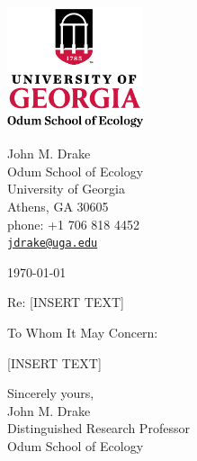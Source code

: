 \documentclass[12pt]{article}
\newcommand{\email}[1]{\href{mailto:#1}{\tt \textcolor{cornflower}{#1}}}
\begin{document}
\begin{minipage}[c]{8in}\vskip-2cm
	\begin{minipage}[c]{4in}
		\begin{flushleft}
			\includegraphics*[width=4cm]{Print-ODUM-V-FC.PNG}%
		\end{flushleft}
	\end{minipage}
	\begin{minipage}[c]{2.5in}
	\begin{flushright}
		{%
			John M. Drake \\
			Odum School of Ecology \\
			University of Georgia \\
			Athens, GA 30605 \\
			phone: +1 706 818 4452  \\
			\email{jdrake@uga.edu}
		}
	\end{flushright}
	\end{minipage}
\end{minipage}

\begin{adjustwidth}{4em}{4em}

\vspace{10mm}

\noindent \today

\vspace{2mm}

\noindent Re: [INSERT TEXT]
\vspace{2mm}

\noindent To Whom It May Concern:

[INSERT TEXT]

\noindent Sincerely yours,\\
John M. Drake\\
Distinguished Research Professor\\
Odum School of Ecology

\end{adjustwidth}
\end{document}
